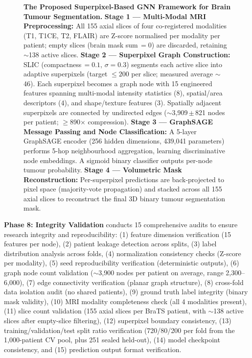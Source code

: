 \begin{figure}[htbp]
\centering
{}
\caption{\textbf{The Proposed Superpixel-Based GNN Framework for Brain Tumour Segmentation.}
\textbf{Stage 1 — Multi-Modal MRI Preprocessing:} All 155 axial slices of four co-registered modalities (T1, T1CE, T2, FLAIR) are Z-score normalised per modality per patient; empty slices (brain mask sum\,$=0$) are discarded, retaining $\sim$138 active slices.
\textbf{Stage 2 — Superpixel Graph Construction:} SLIC (compactness\,$=0.1$, $\sigma=0.3$) segments each active slice into adaptive superpixels (target $\leq 200$ per slice; measured average $\sim$46). Each superpixel becomes a graph node with 15 engineered features spanning multi-modal intensity statistics (8), spatial/area descriptors (4), and shape/texture features (3). Spatially adjacent superpixels are connected by undirected edges ($\sim$3{,}909\,$\pm$\,821 nodes per patient; $\geq$890$\times$ compression).
\textbf{Stage 3 — GraphSAGE Message Passing and Node Classification:} A 5-layer GraphSAGE encoder (256 hidden dimensions, 439{,}041 parameters) performs 5-hop neighbourhood aggregation, learning discriminative node embeddings. A sigmoid binary classifier outputs per-node tumour probability.
\textbf{Stage 4 — Volumetric Mask Reconstruction:} Per-superpixel predictions are back-projected to pixel space (majority-vote propagation) and stacked across all 155 axial slices to reconstruct the final 3D binary tumour segmentation mask.}
\label{fig:framework}
\end{figure}

\textbf{Phase 8: Integrity Validation} conducts 15 comprehensive audits to ensure research integrity and reproducibility: (1) feature dimension verification (15 features per node), (2) patient leakage detection across splits, (3) label distribution analysis across folds, (4) normalization consistency checks (Z-score per modality), (5) seed reproducibility verification (deterministic outputs), (6) graph node count validation ($\sim$3,900 nodes per patient on average, range 2,300--6,000), (7) edge connectivity verification (planar graph structure), (8) cross-fold data isolation audit (no shared patients), (9) ground truth label integrity (binary mask validity), (10) MRI modality completeness check (all 4 modalities present), (11) slice count validation (155 axial slices per BraTS patient, with $\sim$138 active slices after empty-slice filtering), (12) superpixel boundary consistency, (13) training/validation/test split ratio verification (720/80/200 per fold from the 1,000-patient CV pool, plus 251 sealed held-out), (14) model checkpoint consistency, and (15) prediction output format verification.


